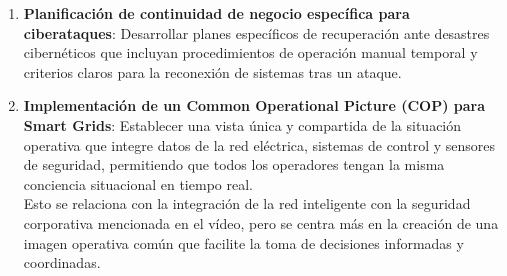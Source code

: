 \begin{enumerate}
   \item \textbf{Planificación de continuidad de negocio específica para ciberataques}: Desarrollar planes específicos de recuperación ante desastres cibernéticos que incluyan procedimientos de operación manual temporal y criterios claros para la reconexión de sistemas tras un ataque.
   
   \item \textbf{Implementación de un Common Operational Picture (COP) para Smart Grids}: Establecer una vista única y compartida de la situación operativa que integre datos de la red eléctrica, sistemas de control y sensores de seguridad, permitiendo que todos los operadores tengan la misma conciencia situacional en tiempo real.\\
   Esto se relaciona con la integración de la red inteligente con la seguridad corporativa mencionada en el vídeo, pero se centra más en la creación de una imagen operativa común que facilite la toma de decisiones informadas y coordinadas.
   

\end{enumerate}
